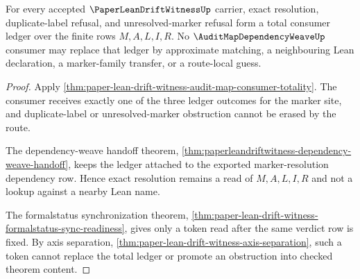 \begin{theorem}
\label{thm:paperleandriftwitness-resolution-ledger-kernel-scope}
For every accepted $\PaperLeanDriftWitnessUp$ carrier, exact resolution, duplicate-label refusal, and unresolved-marker refusal form a total consumer ledger over the finite rows $M,A,L,I,R$. No $\AuditMapDependencyWeaveUp$ consumer may replace that ledger by approximate matching, a neighbouring Lean declaration, a marker-family transfer, or a route-local guess.
\end{theorem}
\begin{proof}
Apply \autoref{thm:paper-lean-drift-witness-audit-map-consumer-totality}. The consumer receives exactly one of the three ledger outcomes for the marker site, and duplicate-label or unresolved-marker obstruction cannot be erased by the route.

The dependency-weave handoff theorem, \autoref{thm:paperleandriftwitness-dependency-weave-handoff}, keeps the ledger attached to the exported marker-resolution dependency row. Hence exact resolution remains a read of $M,A,L,I,R$ and not a lookup against a nearby Lean name.

The formalstatus synchronization theorem, \autoref{thm:paper-lean-drift-witness-formalstatus-sync-readiness}, gives only a token read after the same verdict row is fixed. By axis separation, \autoref{thm:paper-lean-drift-witness-axis-separation}, such a token cannot replace the total ledger or promote an obstruction into checked theorem content.
\end{proof}

